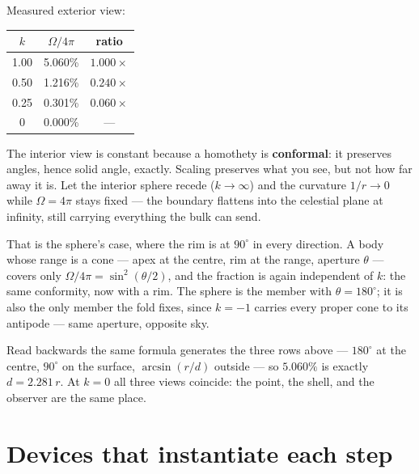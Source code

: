 \documentclass[11pt,fleqn]{article}
\begin{document}
Measured exterior view:

\begin{table}[H]
\centering
\begin{tabular}{@{}ccc@{}}
\toprule
$k$ & $\Omega/4\pi$ & ratio \\
\midrule
1.00 & 5.060\% & $1.000\times$ \\
0.50 & 1.216\% & $0.240\times$ \\
0.25 & 0.301\% & $0.060\times$ \\
0 & 0.000\% & --- \\
\bottomrule
\end{tabular}
\end{table}

The interior view is constant because a homothety is \textbf{conformal}: it preserves angles, hence
solid angle, exactly. Scaling preserves what you see, but not how far away it is. Let the interior
sphere recede ($k \to \infty$) and the curvature $1/r \to 0$ while $\Omega = 4\pi$ stays fixed ---
the boundary flattens into the celestial plane at infinity, still carrying everything the bulk can
send.

That is the sphere's case, where the rim is at $90^\circ$ in every direction. A body whose range is
a cone --- apex at the centre, rim at the range, aperture $\theta$ --- covers only
$\Omega/4\pi = \sin^2(\theta/2)$, and the fraction is again independent of $k$: the same conformity,
now with a rim. The sphere is the member with $\theta = 180^\circ$; it is also the only member the
fold fixes, since $k = -1$ carries every proper cone to its antipode --- same aperture, opposite sky.

Read backwards the same formula generates the three rows above --- $180^\circ$ at the centre,
$90^\circ$ on the surface, $\arcsin(r/d)$ outside --- so $5.060\%$ is exactly $d = 2.281\,r$. At
$k = 0$ all three views coincide: the point, the shell, and the observer are the same place.

\section{Devices that instantiate each step}
\end{document}
